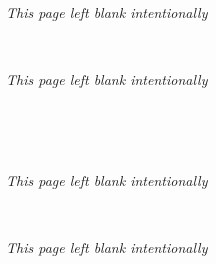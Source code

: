 \documentclass[10pt,twoside]{book}
\begin{document}
\frontmatter

\lhead[\small\thepage]{}
\rhead[]{\small\thepage}
\chead[]{}
\cfoot[]{}


\newpage
 

\newpage
~ 
~ 
~ \newpage
~ 
~ 
~ 
~ \newpage
~ 
~ 
~ 
~ 
~ 
~ \newpage
\centerline{\small\textsl{This page left blank intentionally}}
\thispagestyle{empty}
~ \newpage 
\centerline{\small\textsl{This page left blank intentionally}}
\thispagestyle{empty}
~ \newpage 
\mainmatter

\lhead[\small\thepage\quad ]{}
\chead[]{}
\cfoot[]{}




\resumechapters
\lhead[\small\thepage\quad ]{}
\chead[]{}
\cfoot[]{}




~ \newpage
\centerline{\small\textsl{This page left blank intentionally}}
\thispagestyle{empty}
~ \newpage 
\centerline{\small\textsl{This page left blank intentionally}}
\thispagestyle{empty}
~ \newpage 

~ \makeatletter
~ \renewcommand{\@idxitem}{\par\hangindent 20\p@}
~ \renewcommand*\subitem{\@idxitem \hspace*{10\p@}}
~ \renewcommand*\subsubitem{\@idxitem \hspace*{15\p@}}
~ \makeatother
~ 
~ 
~ 
~ 
~ \label{index}
~ \printindex
\end{document}
